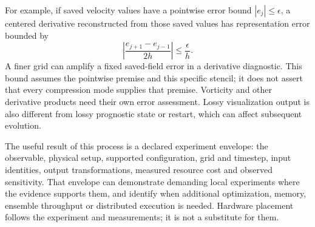 For example, if saved velocity values have a pointwise error bound
$|e_j|\leq\epsilon$, a centered derivative reconstructed from those saved
values has representation error bounded by
\[
 \left|\frac{e_{j+1}-e_{j-1}}{2h}\right|\leq\frac{\epsilon}{h}.
\]
A finer grid can amplify a fixed saved-field error in a derivative diagnostic.
This bound assumes the pointwise premise and this specific stencil; it does
not assert that every compression mode supplies that premise. Vorticity and
other derivative products need their own error assessment. Lossy visualization
output is also different from lossy prognostic state or restart, which can
affect subsequent evolution.

The useful result of this process is a declared experiment envelope: the
observable, physical setup, supported configuration, grid and timestep,
input identities, output transformations, measured resource cost and observed
sensitivity. That envelope can demonstrate demanding local experiments where
the evidence supports them, and identify when additional optimization, memory,
ensemble throughput or distributed execution is needed. Hardware placement
follows the experiment and measurements; it is not a substitute for them.
